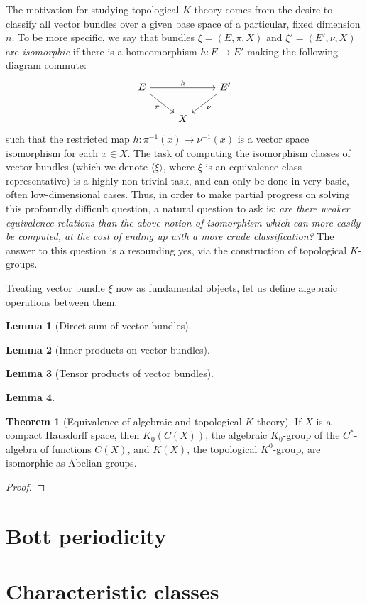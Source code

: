\documentclass[aps,pra,showpacs,notitlepage,onecolumn,superscriptaddress,nofootinbib]{revtex4-1}
\theoremstyle{definition}
\newtheorem{lemma}{Lemma}[section]
\newtheorem{theorem}{Theorem}[section]
\newcommand{\hhrulefill}{\hspace{-1.5em} \hrulefill}
\begin{document}
\noindent The motivation for studying topological $K$-theory comes from the desire to classify all vector bundles over a given base space of a particular, fixed dimension $n$.
To be more specific, we say that bundles $\xi = (E, \pi, X)$ and $\xi' = (E', \nu, X)$ are \emph{isomorphic} if there is a homeomorphism $h : E \rightarrow E'$ making the following diagram commute:
\[\begin{tikzcd}
E && {E'} \\
& X
\arrow["h", from=1-1, to=1-3]
\arrow["\nu", from=1-3, to=2-2]
\arrow["\pi"', from=1-1, to=2-2]
\end{tikzcd}\]
such that the restricted map $h : \pi^{-1}(x) \rightarrow \nu^{-1}(x)$ is a vector space isomorphism for each $x \in X$. The task of computing the isomorphism classes
of vector bundles (which we denote $\langle \xi \rangle$, where $\xi$ is an equivalence class representative) is a highly non-trivial task, and can only be done in very basic, often low-dimensional cases.
Thus, in order to make partial progress on solving this profoundly difficult question, a natural question to ask is: \emph{are there weaker equivalence relations than the above notion of isomorphism which can more easily be computed, at the cost
of ending up with a more crude classification?} The answer to this question is a resounding yes, via the construction of topological $K$-groups.

\hhrulefill

\noindent Treating vector bundle $\xi$ now as fundamental objects, let us define algebraic operations between them.

\begin{lemma}[Direct sum of vector bundles]

\end{lemma}

\begin{lemma}[Inner products on vector bundles]
\end{lemma}

\begin{lemma}[Tensor products of vector bundles]
\end{lemma}

\begin{lemma}

\end{lemma}

\begin{theorem}[Equivalence of algebraic and topological $K$-theory]
If $X$ is a compact Hausdorff space, then $K_0(C(X))$, the algebraic $K_0$-group of the $C^{*}$-algebra of functions $C(X)$, and $K(X)$, the topological $K^{0}$-group, are isomorphic as Abelian groups.
\end{theorem}
\begin{proof}

  \end{proof}

\section{Bott periodicity}

\section{Characteristic classes}
\end{document}
